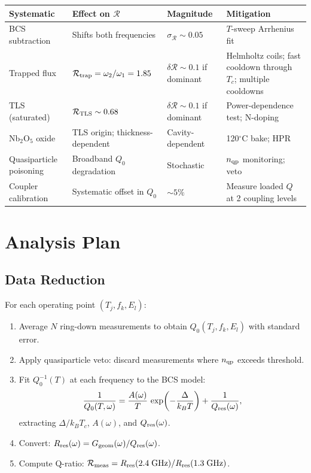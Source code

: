 \documentclass[11pt]{article}
\newcommand{\Rq}{\mathcal{R}}
\begin{document}
\begin{center}
\renewcommand{\arraystretch}{1.3}
\begin{tabular}{@{}p{3.5cm}p{3cm}p{3cm}p{3.5cm}@{}}
\toprule
\textbf{Systematic} & \textbf{Effect on $\Rq$} & \textbf{Magnitude} &
\textbf{Mitigation} \\
\midrule
BCS subtraction & Shifts both frequencies & $\sigma_{\Rq} \sim 0.05$ &
$T$-sweep Arrhenius fit \\
Trapped flux & $\Rq_{\rm trap} = \omega_2/\omega_1 = 1.85$ &
$\delta\Rq \sim 0.1$ if dominant & Helmholtz coils; fast cooldown
through $T_c$; multiple cooldowns \\
TLS (saturated) & $\Rq_{\rm TLS} \sim 0.68$ & $\delta\Rq \sim 0.1$
if dominant & Power-dependence test; N-doping \\
Nb$_2$O$_5$ oxide & TLS origin; thickness-dependent & Cavity-dependent &
120$^\circ$C bake; HPR \\
Quasiparticle poisoning & Broadband $Q_0$ degradation & Stochastic &
$n_{\rm qp}$ monitoring; veto \\
Coupler calibration & Systematic offset in $Q_0$ & $\sim 5\%$ &
Measure loaded $Q$ at 2 coupling levels \\
\bottomrule
\end{tabular}
\end{center}


\section{Analysis Plan}
\label{sec:analysis}

\subsection{Data Reduction}

For each operating point $(T_j, f_k, E_l)$:

\begin{enumerate}[nosep]
\item Average $N$ ring-down measurements to obtain $Q_0(T_j, f_k, E_l)$
  with standard error.
\item Apply quasiparticle veto: discard measurements where $n_{\rm qp}$
  exceeds threshold.
\item Fit $Q_0^{-1}(T)$ at each frequency to the BCS model:
  \begin{equation}
  \frac{1}{Q_0(T, \omega)} = \frac{A(\omega)}{T}\,
  \exp\!\left(-\frac{\Delta}{k_BT}\right) + \frac{1}{Q_{\rm res}(\omega)},
  \end{equation}
  extracting $\Delta/k_BT_c$, $A(\omega)$, and $Q_{\rm res}(\omega)$.
\item Convert: $R_{\rm res}(\omega) = G_{\rm geom}(\omega)/Q_{\rm res}(\omega)$.
\item Compute Q-ratio: $\Rq_{\rm meas} = R_{\rm res}(2.4\;\text{GHz})/
  R_{\rm res}(1.3\;\text{GHz})$.
\end{enumerate}
\end{document}
